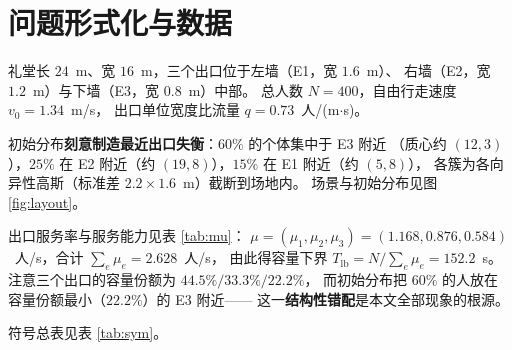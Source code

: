 \section{问题形式化与数据}
\label{sec:problem}

礼堂长 $24$~m、宽 $16$~m，三个出口位于左墙（E1，宽 $1.6$~m）、
右墙（E2，宽 $1.2$~m）与下墙（E3，宽 $0.8$~m）中部。
总人数 $N=400$，自由行走速度 $v_0=1.34$~m/s，
出口单位宽度比流量 $q=0.73$~人/(m$\cdot$s)。

初始分布\textbf{刻意制造最近出口失衡}：$60\%$ 的个体集中于 E3 附近
（质心约 $(12,3)$），$25\%$ 在 E2 附近（约 $(19,8)$），$15\%$ 在 E1 附近（约 $(5,8)$），
各簇为各向异性高斯（标准差 $2.2\times1.6$~m）截断到场地内。
场景与初始分布见图 \ref{fig:layout}。

出口服务率与服务能力见表 \ref{tab:mu}：
$\mu=(\mu_1,\mu_2,\mu_3)=(1.168,0.876,0.584)$~人/s，合计 $\sum_e\mu_e=2.628$~人/s，
由此得容量下界 $T_{\mathrm{lb}}=N/\sum_e\mu_e=152.2$~s。
注意三个出口的容量份额为 $44.5\%/33.3\%/22.2\%$，
而初始分布把 $60\%$ 的人放在容量份额最小（$22.2\%$）的 E3 附近——
这一\textbf{结构性错配}是本文全部现象的根源。

符号总表见表 \ref{tab:sym}。

